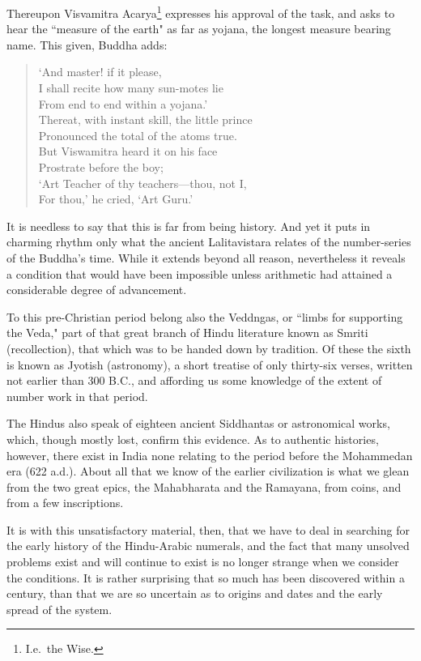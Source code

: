 \documentclass[11pt,a4paper]{article}
\begin{document}
Thereupon Visvamitra Acarya\footnote{I.e.\ the Wise.} expresses his approval of the task, and asks to hear the ``measure of the earth" as far as yojana, the longest measure bearing name. This given, Buddha adds:

\begin{verse}
`And master! if it please,\\
I shall recite how many sun-motes lie\\
From end to end within a yojana.'\\
Thereat, with instant skill, the little prince\\
Pronounced the total of the atoms true.\\
But Viswamitra heard it on his face\\
Prostrate before the boy;\\
`Art Teacher of thy teachers---thou, not I,\\
For thou,' he cried, `Art Guru.'
\end{verse}

It is needless to say that this is far from being history. And yet it puts in charming rhythm only what the ancient Lalitavistara relates of the number-series of the Buddha's time. While it extends beyond all reason, nevertheless it reveals a condition that would have been impossible unless arithmetic had attained a considerable degree of advancement.

To this pre-Christian period belong also the Veddngas, or ``limbs for supporting the Veda," part of that great branch of Hindu literature known as Smriti (recollection), that which was to be handed down by tradition. Of these the sixth is known as Jyotish (astronomy), a short treatise of only thirty-six verses, written not earlier than 300 B.C., and affording us some knowledge of the extent of number work in that period.

The Hindus also speak of eighteen ancient Siddhantas or astronomical works, which, though mostly lost, confirm this evidence. As to authentic histories, however, there exist in India none relating to the period before the Mohammedan era (622 a.d.). About all that we know of the earlier civilization is what we glean from the two great epics, the Mahabharata and the Ramayana, from coins, and from a few inscriptions.

It is with this unsatisfactory material, then, that we have to deal in searching for the early history of the Hindu-Arabic numerals, and the fact that many unsolved problems exist and will continue to exist is no longer strange when we consider the conditions. It is rather surprising that so much has been discovered within a century, than that we are so uncertain as to origins and dates and the early spread of the system.
\end{document}
